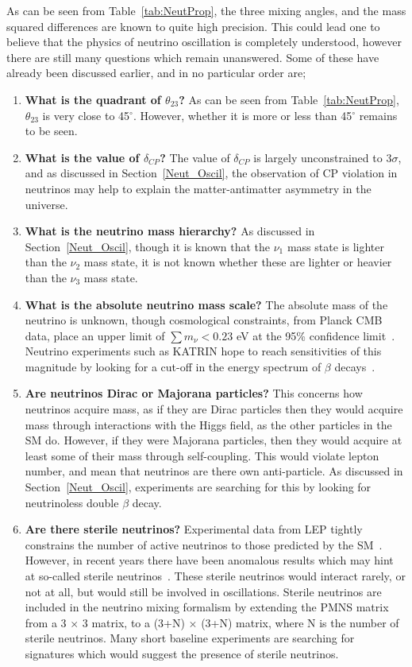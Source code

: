 As can be seen from Table~\ref{tab:NeutProp}, the three mixing angles, and the mass squared differences are known to quite high precision. This could lead one to believe that the physics of neutrino oscillation is completely understood, however there are still many questions which remain unanswered. Some of these have already been discussed earlier, and in no particular order are;
\begin{enumerate}
\item \textbf{What is the quadrant of $\theta_{23}$?} As can be seen from Table~\ref{tab:NeutProp}, $\theta_{23}$ is very close to 45$^{\circ}$. However, whether it is more or less than 45$^{\circ}$ remains to be seen.
\item \textbf{What is the value of $\delta_{CP}$?} The value of $\delta_{CP}$ is largely unconstrained to 3$\sigma$, and as discussed in Section~\ref{Neut_Oscil}, the observation of CP violation in neutrinos may help to explain the matter-antimatter asymmetry in the universe.  
\item \textbf{What is the neutrino mass hierarchy?} As discussed in Section~\ref{Neut_Oscil}, though it is known that the $\nu_{1}$ mass state is lighter than the $\nu_{2}$ mass state, it is not known whether these are lighter or heavier than the $\nu_{3}$ mass state.
\item \textbf{What is the absolute neutrino mass scale?} The absolute mass of the neutrino is unknown, though cosmological constraints, from Planck CMB data, place an upper limit of $\sum m_{\nu} < 0.23$ eV at the 95\% confidence limit~\citep{Planck}. Neutrino experiments such as KATRIN hope to reach sensitivities of this magnitude by looking for a cut-off in the energy spectrum of $\beta$ decays~\citep{KATRIN}.
\item \textbf{Are neutrinos Dirac or Majorana particles?} This concerns how neutrinos acquire mass, as if they are Dirac particles then they would acquire mass through interactions with the Higgs field, as the other particles in the SM do. However, if they were Majorana particles, then they would acquire at least some of their mass through self-coupling. This would violate lepton number, and mean that neutrinos are there own anti-particle. As discussed in Section~\ref{Neut_Oscil}, experiments are searching for this by looking for neutrinoless double $\beta$ decay.
\item \textbf{Are there sterile neutrinos?} Experimental data from LEP tightly constrains the number of active neutrinos to those predicted by the SM~\citep{LEP}. However, in recent years there have been anomalous results which may hint at so-called sterile neutrinos~\citep{LSND1, LSND2, MiniBooNE}. These sterile neutrinos would interact rarely, or not at all, but would still be involved in oscillations. Sterile neutrinos are included in the neutrino mixing formalism by extending the PMNS matrix from a 3 $\times$ 3 matrix, to a (3+N) $\times$ (3+N) matrix, where N is the number of sterile neutrinos. Many short baseline experiments are searching for signatures which would suggest the presence of sterile neutrinos.  
\end{enumerate}
